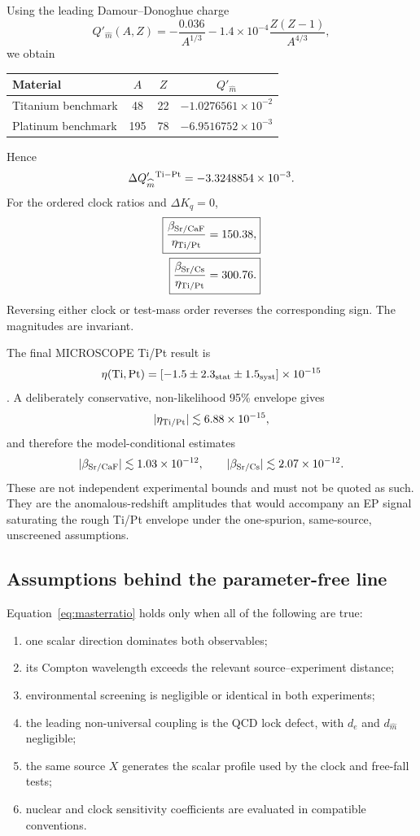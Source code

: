 \documentclass[11pt,a4paper]{article}
\begin{document}
Using the leading Damour--Donoghue charge
\[
Q'_{\widehat m}(A,Z)
=-\frac{0.036}{A^{1/3}}
-1.4\times10^{-4}\frac{Z(Z-1)}{A^{4/3}},
\label{eq:Qm}
\]
we obtain
\begin{center}
\begin{tabular}{@{}lccc@{}}
\toprule
Material & $A$ & $Z$ & $Q'_{\widehat m}$ \\
\midrule
Titanium benchmark & 48 & 22 & $-1.0276561\times10^{-2}$ \\
Platinum benchmark & 195 & 78 & $-6.9516752\times10^{-3}$ \\
\bottomrule
\end{tabular}
\end{center}
Hence
\[
\Delta Q'_{\widehat m}{}^{\rm Ti-Pt}
=-3.3248854\times10^{-3}.
\]
For the ordered clock ratios and $\Delta K_q=0$,
\begin{align}
\boxed{
\frac{\beta_{\rm Sr/CaF}}{\eta_{\rm Ti/Pt}}
=150.38,
}
\label{eq:150}\\
\boxed{
\frac{\beta_{\rm Sr/Cs}}{\eta_{\rm Ti/Pt}}
=300.76.
}
\label{eq:300}
\end{align}
Reversing either clock or test-mass order reverses the corresponding sign. The magnitudes are invariant.

The final MICROSCOPE Ti/Pt result is
\[
\eta({\rm Ti,Pt})
=[-1.5\pm2.3_{\rm stat}\pm1.5_{\rm syst}]\times10^{-15}
\]
\cite{MICROSCOPE2022}. A deliberately conservative, non-likelihood 95\% envelope gives
\[
|\eta_{\rm Ti/Pt}|\lesssim6.88\times10^{-15},
\]
and therefore the model-conditional estimates
\[
|\beta_{\rm Sr/CaF}|\lesssim1.03\times10^{-12},
\qquad
|\beta_{\rm Sr/Cs}|\lesssim2.07\times10^{-12}.
\]
These are not independent experimental bounds and must not be quoted as such. They are the anomalous-redshift amplitudes that would accompany an EP signal saturating the rough Ti/Pt envelope under the one-spurion, same-source, unscreened assumptions.

\subsection{Assumptions behind the parameter-free line}

Equation~\eqref{eq:masterratio} holds only when all of the following are true:

\begin{enumerate}
  \item one scalar direction dominates both observables;
  \item its Compton wavelength exceeds the relevant source--experiment distance;
  \item environmental screening is negligible or identical in both experiments;
  \item the leading non-universal coupling is the QCD lock defect, with $d_e$ and $d_{\widehat m}$ negligible;
  \item the same source $X$ generates the scalar profile used by the clock and free-fall tests;
  \item nuclear and clock sensitivity coefficients are evaluated in compatible conventions.
\end{enumerate}
\end{document}
